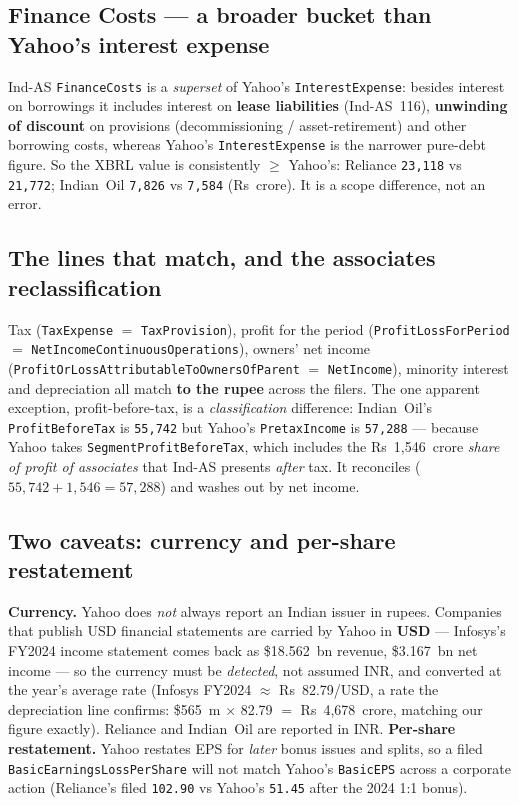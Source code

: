 \documentclass[11pt,a4paper]{report}
\begin{document}
\subsection{Finance Costs --- a broader bucket than Yahoo's interest expense}
Ind-AS \texttt{FinanceCosts} is a \emph{superset} of Yahoo's \texttt{InterestExpense}: besides interest on
borrowings it includes interest on \textbf{lease liabilities} (Ind-AS~116), \textbf{unwinding of discount}
on provisions (decommissioning / asset-retirement) and other borrowing costs, whereas Yahoo's
\texttt{InterestExpense} is the narrower pure-debt figure. So the XBRL value is consistently $\ge$ Yahoo's:
Reliance \texttt{23{,}118} vs \texttt{21{,}772}; Indian~Oil \texttt{7{,}826} vs \texttt{7{,}584} (Rs~crore).
It is a scope difference, not an error.

\subsection{The lines that match, and the associates reclassification}
Tax (\texttt{TaxExpense} $=$ \texttt{TaxProvision}), profit for the period (\texttt{ProfitLossForPeriod} $=$
\texttt{NetIncomeContinuousOperations}), owners' net income
(\texttt{ProfitOrLossAttributableToOwnersOfParent} $=$ \texttt{NetIncome}), minority interest and
depreciation all match \textbf{to the rupee} across the filers. The one apparent exception, profit-before-tax,
is a \emph{classification} difference: Indian~Oil's \texttt{ProfitBeforeTax} is \texttt{55{,}742} but Yahoo's
\texttt{PretaxIncome} is \texttt{57{,}288} --- because Yahoo takes \texttt{SegmentProfitBeforeTax}, which
includes the Rs~1{,}546~crore \emph{share of profit of associates} that Ind-AS presents \emph{after} tax.
It reconciles ($55{,}742 + 1{,}546 = 57{,}288$) and washes out by net income.

\subsection{Two caveats: currency and per-share restatement}
\textbf{Currency.} Yahoo does \emph{not} always report an Indian issuer in rupees. Companies that publish
USD financial statements are carried by Yahoo in \textbf{USD} --- Infosys's FY2024 income statement comes
back as \$18.562~bn revenue, \$3.167~bn net income --- so the currency must be \emph{detected}, not assumed
INR, and converted at the year's average rate (Infosys FY2024 $\approx$ Rs~82.79/USD, a rate the
depreciation line confirms: \$565~m $\times$ 82.79 $=$ Rs~4{,}678~crore, matching our figure exactly).
Reliance and Indian~Oil are reported in INR. \textbf{Per-share restatement.} Yahoo restates EPS for
\emph{later} bonus issues and splits, so a filed \texttt{BasicEarningsLossPerShare} will not match Yahoo's
\texttt{BasicEPS} across a corporate action (Reliance's filed \texttt{102.90} vs Yahoo's \texttt{51.45}
after the 2024 1:1 bonus).
\end{document}
